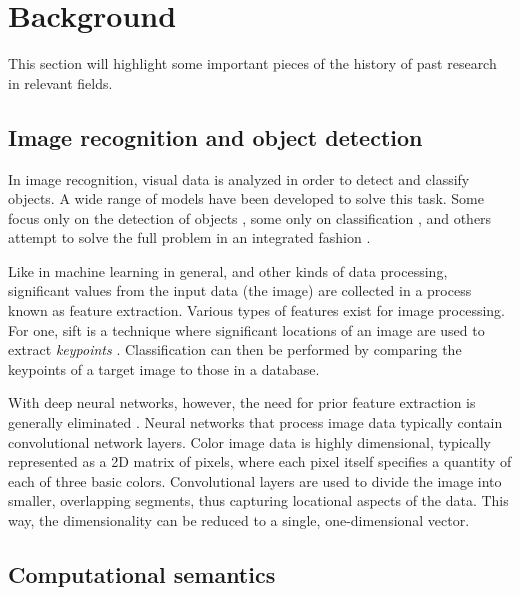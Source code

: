 \renewcommand{\sectionautorefname}{Section}
\let\subsectionautorefname\sectionautorefname
\let\subsubsectionautorefname\sectionautorefname
\glsresetall
\section{Background}
\label{sec:background}

This section will highlight some important pieces of the history of past research in relevant fields.

\subsection{Image recognition and object detection}

In image recognition, visual data is analyzed in order to detect and classify objects.
A wide range of models have been developed to solve this task.
Some focus only on the detection of objects \citep{BlaschkoLearningLocalizeObjects2008}, some only on classification \citep[e.g. ResNet,][]{HeDeepResidualLearning2015}, and others attempt to solve the full problem in an integrated fashion \citep{RedmonYouOnlyLook2015,HeMaskRCNN2017}.

Like in machine learning in general, and other kinds of data processing, significant values from the input data (the image) are collected in a process known as feature extraction.
Various types of features exist for image processing.
For one, \gls{sift} is a technique where significant locations of an image are used to extract \textit{keypoints} \citep{LoweObjectrecognitionlocal1999}.
Classification can then be performed by comparing the keypoints of a target image to those in a database.

With deep neural networks, however, the need for prior feature extraction is generally eliminated \citep{HeDeepResidualLearning2015, HeMaskRCNN2017}.
Neural networks that process image data typically contain convolutional network layers.
Color image data is highly dimensional, typically represented as a 2D matrix of pixels, where each pixel itself specifies a quantity of each of three basic colors.
Convolutional layers are used to divide the image into smaller, overlapping segments, thus capturing locational aspects of the data.
This way, the dimensionality can be reduced to a single, one-dimensional vector.



\subsection{Computational semantics}
\label{sec:compsem}


